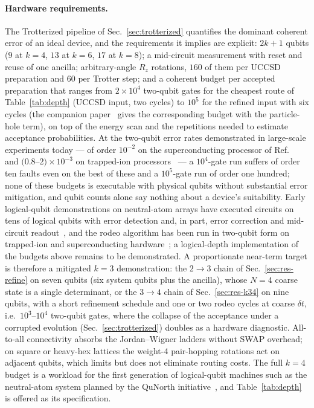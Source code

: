 \documentclass[
  aps,            %
  prc,            %
  reprint,        %
  superscriptaddress,
  floatfix,
  nofootinbib
]{revtex4-2}
\begin{document}
\paragraph{Hardware requirements.}
The Trotterized pipeline of Sec.~\ref{sec:trotterized} quantifies the dominant
coherent error of an ideal device, and the requirements it implies are
explicit: $2k+1$ qubits ($9$ at $k=4$, $13$ at $k=6$, $17$ at $k=8$); a
mid-circuit measurement with reset and reuse of one ancilla; arbitrary-angle
$R_z$ rotations, $160$ of them per UCCSD preparation and $60$ per Trotter
step; and a coherent budget per accepted preparation that ranges from
$2\times10^{4}$ two-qubit gates for the cheapest route of
Table~\ref{tab:depth} (UCCSD input, two cycles) to $10^{5}$ for the refined
input with six cycles (the companion paper~\cite{PHcompanion} gives the
corresponding budget with the particle-hole term), on top of the energy scan
and the repetitions needed to estimate acceptance probabilities.  At the
two-qubit error rates
demonstrated in large-scale experiments today --- of order $10^{-2}$ on the
superconducting processor of Ref.~\cite{Kim2023} and $(0.8$--$2)\times10^{-3}$
on trapped-ion processors~\cite{Moses2023,Ransford2025} --- a $10^{4}$-gate
run suffers of order ten faults even on the best of these and a
$10^{5}$-gate run of order one hundred; none of these
budgets is executable with physical qubits without substantial error
mitigation, and qubit counts alone say nothing about a device's suitability.
Early logical-qubit demonstrations on neutral-atom arrays have executed
circuits on tens of logical qubits with error detection and, in part, error
correction and mid-circuit readout~\cite{Bluvstein2024,Reichardt2024}, and the
rodeo algorithm has been run in two-qubit form on trapped-ion and
superconducting hardware~\cite{BeeLindgren2022,Qian2024}; a logical-depth
implementation of the budgets above remains to be demonstrated.  A
proportionate near-term target is therefore a mitigated $k=3$ demonstration:
the $2\to3$ chain of Sec.~\ref{sec:res-refine} on seven qubits (six system
qubits plus the ancilla), whose $N=4$ coarse state is a single determinant, or
the $3\to4$ chain of Sec.~\ref{sec:res-k34} on nine qubits, with a short
refinement schedule and one or two rodeo cycles at coarse $\delta t$, i.e.\
$10^{3}$--$10^{4}$ two-qubit gates, where the collapse of the acceptance under
a corrupted evolution (Sec.~\ref{sec:trotterized}) doubles as a hardware
diagnostic.  All-to-all connectivity absorbs the Jordan--Wigner ladders
without SWAP overhead; on square or heavy-hex lattices the weight-4
pair-hopping rotations act on adjacent qubits, which limits but does not
eliminate routing costs.
The full $k=4$ budget is a workload for the first generation of logical-qubit
machines such as the neutral-atom system planned by the QuNorth
initiative~\cite{QuNorth}, and Table~\ref{tab:depth} is offered as its
specification.
\end{document}
